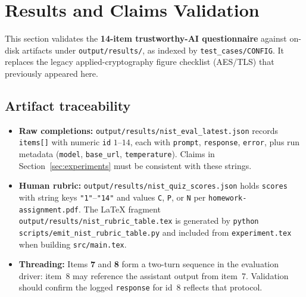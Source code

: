 \section{Results and Claims Validation}
\label{sec:results-validation}

This section validates the \textbf{14-item trustworthy-AI questionnaire} against on-disk artifacts under \texttt{output/results/}, as indexed by \texttt{test\_cases/CONFIG}. It replaces the legacy applied-cryptography figure checklist (AES/TLS) that previously appeared here.

\subsection{Artifact traceability}
\begin{itemize}
  \item \textbf{Raw completions:} \texttt{output/results/nist\_eval\_latest.json} records \texttt{items[]} with numeric \texttt{id} $1$--$14$, each with \texttt{prompt}, \texttt{response}, \texttt{error}, plus run metadata (\texttt{model}, \texttt{base\_url}, \texttt{temperature}). Claims in Section~\ref{sec:experiments} must be consistent with these strings.
  \item \textbf{Human rubric:} \texttt{output/results/nist\_quiz\_scores.json} holds \texttt{scores} with string keys \texttt{"1"}--\texttt{"14"} and values \texttt{C}, \texttt{P}, or \texttt{N} per \texttt{homework-assignment.pdf}. The LaTeX fragment \texttt{output/results/nist\_rubric\_table.tex} is generated by \texttt{python scripts/emit\_nist\_rubric\_table.py} and included from \texttt{experiment.tex} when building \texttt{src/main.tex}.
  \item \textbf{Threading:} Items \textbf{7} and \textbf{8} form a two-turn sequence in the evaluation driver: item~8 may reference the assistant output from item~7. Validation should confirm the logged \texttt{response} for id~8 reflects that protocol.
\end{itemize}

